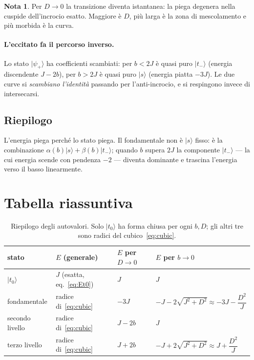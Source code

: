 \documentclass[11pt,a4paper]{article}
\newcommand{\ket}[1]{\lvert #1 \rangle}
\theoremstyle{definition}
\newtheorem*{nota}{Nota}
\begin{document}
\begin{nota}
Per $D\to0$ la transizione diventa istantanea: la piega degenera nella cuspide
dell'incrocio esatto. Maggiore è $D$, più larga è la zona di mescolamento e più
morbida è la curva.
\end{nota}

\paragraph{L'eccitato fa il percorso inverso.}
Lo stato $\ket{\psi_+}$ ha coefficienti scambiati: per $b<2J$ è quasi puro $\ket{t_-}$
(energia discendente $J-2b$), per $b>2J$ è quasi puro $\ket{s}$ (energia piatta $-3J$).
Le due curve si \emph{scambiano l'identità} passando per l'anti-incrocio, e si respingono
invece di intersecarsi.

\subsection{Riepilogo}

L'energia piega perché lo stato piega. Il fondamentale non è $\ket{s}$ fisso: è la
combinazione $\alpha(b)\ket{s}+\beta(b)\ket{t_-}$; quando $b$ supera $2J$ la componente
$\ket{t_-}$ — la cui energia scende con pendenza $-2$ — diventa dominante e trascina
l'energia verso il basso linearmente.

\FloatBarrier
\section*{Tabella riassuntiva}

\begin{table}[htbp]
\centering
\renewcommand{\arraystretch}{1.4}
\begin{tabular}{llll}
\toprule
stato & $E$ (generale) & $E$ per $D\to0$ & $E$ per $b\to0$ \\
\midrule
$\ket{t_0}$ & $J$ (esatta, eq.~\eqref{eq:Et0}) & $J$ & $J$ \\
fondamentale
  & radice di~\eqref{eq:cubic}
  & $-3J$
  & $-J-2\sqrt{J^2+D^2}\approx-3J-\dfrac{D^2}{J}$ \\[6pt]
secondo livello
  & radice di~\eqref{eq:cubic}
  & $J-2b$
  & $J$ \\
terzo livello
  & radice di~\eqref{eq:cubic}
  & $J+2b$
  & $-J+2\sqrt{J^2+D^2}\approx J+\dfrac{D^2}{J}$ \\
\bottomrule
\end{tabular}
\caption{Riepilogo degli autovalori. Solo $\ket{t_0}$ ha forma chiusa per ogni $b,D$; gli altri tre
sono radici del cubico~\eqref{eq:cubic}.}
\label{tab:riepilogo}
\end{table}
\end{document}
